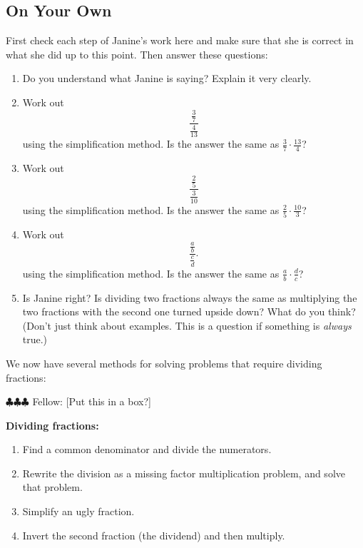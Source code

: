 \documentclass[10pt, reqno]{amsart}
\theoremstyle{remark}
\theoremstyle{definition}
\numberwithin{equation}{section}  %
\newcommand{\fellow}[1]{{\color{magenta} \sf $\clubsuit\clubsuit\clubsuit$ Fellow: [#1]}}
\begin{document}
\subsection*{On Your Own}
First check each step of Janine's work here and make sure that she is correct in what
she did up to this point.  Then answer these questions:
\begin{enumerate}
\item
Do you understand what Janine is saying?  Explain it very clearly.\\


\item
Work out
\[
\frac{\frac{3}{7}}{\frac4{13}}
\]
using the simplification method.  Is the answer the same as
$\frac 3 7 \cdot \frac{13}4$?\\

\item
Work out
\[
\frac{\frac{2}{5}}{\frac 3{10}}
\]
using the simplification method.  Is the answer the same as
$\frac 2 5 \cdot \frac{10}3$?\\

\item
Work out
\[
\frac{\frac{a}{b}}{\frac c{d}}.
\]
using the simplification method.  Is the answer the same as
$\frac a b \cdot \frac{d}c$?\\

\item
Is Janine right? Is dividing two fractions always the same as multiplying the
two fractions with the second one turned upside down? What do you think?  (Don't just think about  examples.  This is a question if something is \emph{always} true.)\\

\end{enumerate}


We now have several methods for solving problems that require dividing fractions:

\fellow{Put this in a box?}

\noindent
{\bf Dividing fractions:}
\begin{enumerate}
\item
Find a common denominator and divide the numerators.
\item
Rewrite the division as  a missing factor multiplication problem, and solve that problem.
\item
Simplify an ugly fraction.
\item
Invert the second fraction (the dividend) and then multiply.

\end{enumerate}
\end{document}

